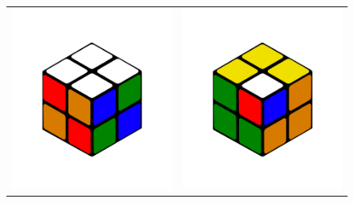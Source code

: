 \documentclass[12pt,a4paper, usenames, dvipsnames]{article}
\theoremstyle{mystyle}
\theoremstyle{definition}
\begin{document}
\begin{figure}[h]
\begin{tabular}{cc}
\includegraphics[scale=0.1]{RRFFRRUU.png} &  \includegraphics[scale=0.1]{CubeInCube.png} \\

\end{tabular}
\end{figure}
\end{document}

